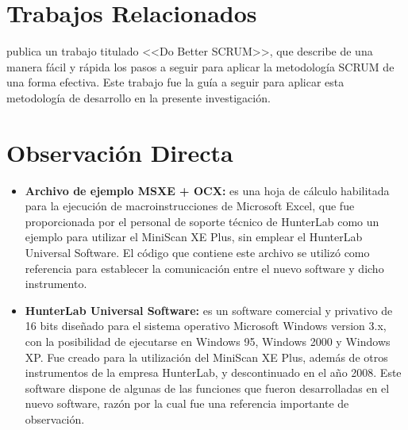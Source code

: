	\section{Trabajos Relacionados}
	\cite{Hundermark} publica un trabajo titulado <<Do Better SCRUM>>, que describe de una manera f\'{a}cil y r\'{a}pida los pasos a seguir para aplicar la metodolog\'{i}a SCRUM de una forma efectiva. Este trabajo fue la gu\'{i}a a seguir para aplicar esta metodolog\'{i}a de desarrollo en la presente investigaci\'{o}n.
	

	\section{Observaci\'{o}n Directa}
		\begin{itemize}
		
			\item \textbf{Archivo de ejemplo MSXE + OCX:} es una hoja de c\'{a}lculo habilitada para la ejecuci\'{o}n de macroinstrucciones de Microsoft Excel, que fue proporcionada por el personal de soporte t\'{e}cnico de HunterLab como un ejemplo para utilizar el MiniScan XE Plus, sin emplear el HunterLab Universal Software. El c\'{o}digo que contiene este archivo se utiliz\'{o} como referencia para establecer la comunicaci\'{o}n entre el nuevo software y dicho instrumento.

			
			\item \textbf{HunterLab Universal Software:} es un software comercial y privativo de 16 bits dise\~{n}ado para el sistema operativo Microsoft Windows version 3.x, con la posibilidad de ejecutarse en Windows 95, Windows 2000 y Windows XP. Fue creado para la utilizaci\'{o}n del MiniScan XE Plus, adem\'{a}s de otros instrumentos de la empresa HunterLab, y descontinuado en el a\~{n}o 2008. Este software dispone de algunas de las funciones que fueron desarrolladas en el nuevo software, raz\'{o}n por la cual fue una referencia importante de observaci\'{o}n.

		\end{itemize}